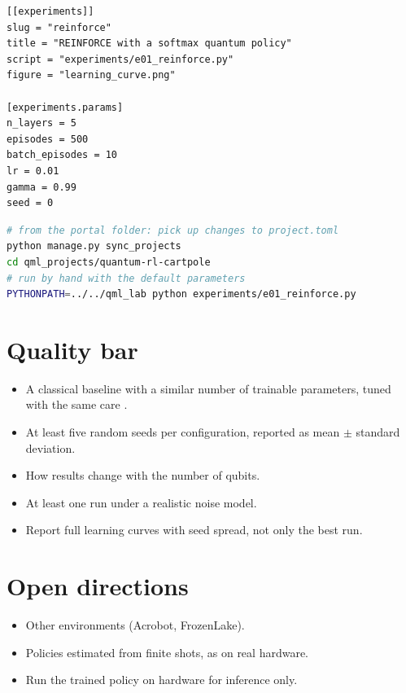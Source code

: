 \documentclass[11pt,a4paper]{article}
\begin{document}
\begin{lstlisting}[language={}]
[[experiments]]
slug = "reinforce"
title = "REINFORCE with a softmax quantum policy"
script = "experiments/e01_reinforce.py"
figure = "learning_curve.png"

[experiments.params]
n_layers = 5
episodes = 500
batch_episodes = 10
lr = 0.01
gamma = 0.99
seed = 0
\end{lstlisting}

\begin{lstlisting}[language=bash]
# from the portal folder: pick up changes to project.toml
python manage.py sync_projects
cd qml_projects/quantum-rl-cartpole
# run by hand with the default parameters
PYTHONPATH=../../qml_lab python experiments/e01_reinforce.py
\end{lstlisting}

\section{Quality bar}
\begin{itemize}
  \item A classical baseline with a similar number of trainable parameters, tuned with the same care \citep{bowles2024}.
  \item At least five random seeds per configuration, reported as mean $\pm$ standard deviation.
  \item How results change with the number of qubits.
  \item At least one run under a realistic noise model.
  \item Report full learning curves with seed spread, not only the best run.
\end{itemize}

\section{Open directions}
\begin{itemize}
  \item Other environments (Acrobot, FrozenLake).
  \item Policies estimated from finite shots, as on real hardware.
  \item Run the trained policy on hardware for inference only.
\end{itemize}
\end{document}
